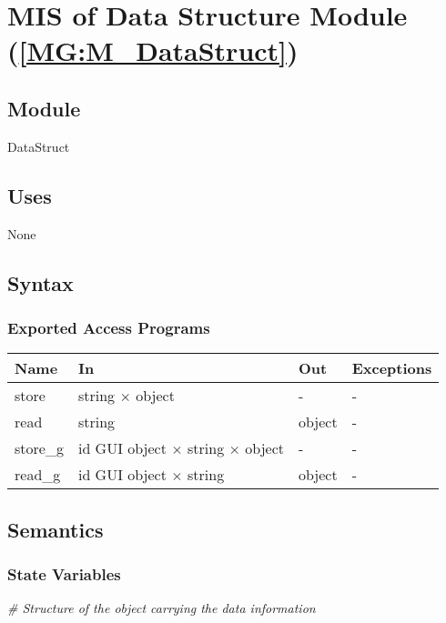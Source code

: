 \documentclass[12pt, titlepage]{article}
\begin{document}
\section{MIS of Data Structure Module 
(\texorpdfstring{\cref{MG:M_DataStruct}}))} \label{MIS_DataStruct}

\subsection{Module}
DataStruct
\subsection{Uses}
None
\subsection{Syntax}

\subsubsection{Exported Access Programs}

\begin{center}
\begin{tabular}{p{4cm} p{4cm} p{4cm} p{2cm}}
\hline
\textbf{Name} & \textbf{In} & \textbf{Out} & \textbf{Exceptions} \\
\hline
store & string $\times$ object & - & - \\
read & string & object & - \\
store{\_}g & id GUI object $\times$ string $\times$ object & - & - \\
read{\_}g & id GUI object $\times$ string & object & - \\
\hline
\end{tabular}
\end{center}

\subsection{Semantics}

\subsubsection{State Variables}

\noindent\textit{{\#} Structure of the object carrying the data 
information}\medskip
\end{document}
